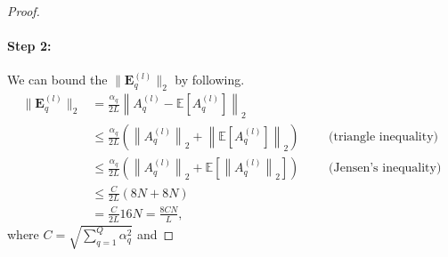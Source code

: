 \begin{proof}
\paragraph{Step 2:}We can bound the $\|\mathbf{E}_{q}^{(l)}\|_2$ by following.
        \begin{subequations}
        \label{eq:upper_bound_e_l_q}
            \begin{align}
            \|\mathbf{E}_{q}^{(l)}\|_2 & =\frac{\alpha_q}{2L} \left\|A_{q}^{(l)}-\mathbb{E} \left[A_{q}^{(l)}\right]\right\|_2 \\
            & \leq \frac{\alpha_q}{2L}\left(\left\|A_{q}^{(l)}\right\|_2+\left\|\mathbb{E}\left[A_{q}^{(l)}\right]\right\|_2\right) \quad \quad \text{ (triangle inequality)}\\
            & \leq \frac{\alpha_q}{2L}\left(\left\|A_{q}^{(l)}\right\|_2+ \mathbb{E} \left[ \left\| A_{q}^{(l)} \right\|_2 \right] \right)   \quad \quad \text{  (Jensen’s inequality)}\\
            & \leq \frac{C}{2L}\left( 8N + 8N\right) \label{subeq:step2_d}\\
            & = \frac{C}{2L} 16 N = \frac{8CN}{L},
            \end{align}
        \end{subequations}
where $ C = \sqrt{\sum_{q=1}^Q \alpha_q^2}$ and 


\end{proof}

